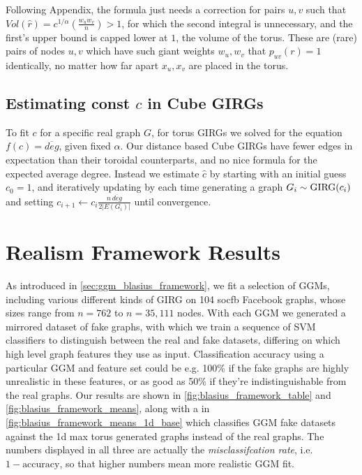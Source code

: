 Following \cite{blasius2022efficiently} Appendix, the formula just needs a correction for pairs $u, v$ such that $Vol(\hat{r}) = c^{1/\alpha} \left ( \frac{w_u w_v}{n} \right ) > 1$, for which the second integral is unnecessary, and the first's upper bound is capped lower at $1$, the volume of the torus. These are (rare) pairs of nodes $u, v$ which have such giant weights $w_u, w_v$ that $p_{uv}(r) = 1$ identically, no matter how far apart $x_u, x_v$ are placed in the torus.



\subsection{Estimating const $c$ in Cube GIRGs}
To fit $c$ for a specific real graph $G$, for torus GIRGs we solved for the equation $f(c) = \overline{deg}$, given fixed $\alpha$. Our distance based Cube GIRGs have fewer edges in expectation than their toroidal counterparts, and no nice formula for the expected average degree. Instead we estimate $\hat{c}$ by starting with an initial guess $c_0=1$, and iteratively updating by each time generating a graph $G_i \sim \mathrm{GIRG}(c_i)$ and setting $c_{i+1} \gets c_i \frac{n \, \overline{deg}}{2 |E(G_i)|}$ until convergence.


\section{Realism Framework Results}
As introduced in \cref{sec:ggm_blasius_framework}, we fit a selection of GGMs, including various different kinds of GIRG on 104 socfb Facebook graphs, whose sizes range from $n=762$ to $n=35,111$ nodes. With each GGM we generated a mirrored dataset of fake graphs, with which we train a sequence of SVM classifiers to distinguish between the real and fake datasets, differing on which high level graph features they use as input. Classification accuracy using a particular GGM and feature set could be e.g. 100\% if the fake graphs are highly unrealistic in these features, or as good as 50\% if they're indistinguishable from the real graphs. Our results are shown in \cref{fig:blasius_framework_table} and \cref{fig:blasius_framework_means}, along with a  in \cref{fig:blasius_framework_means_1d_base} which classifies GGM fake datasets against the 1d max torus generated graphs instead of the real graphs. The numbers displayed in all three are actually the \textit{misclassifcation rate}, i.e. $1 - \text{accuracy}$, so that higher numbers mean more realistic GGM fit.

